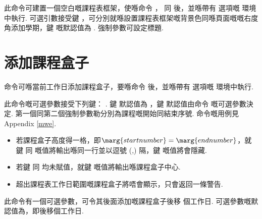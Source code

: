 \documentclass[letterpaper]{l3doc}
\begin{document}
\begin{function}{\maketable}
  \begin{syntax}
       
  \end{syntax}

  此命令可建置一個空白嘅課程表框架，使喺命令 ， 同  後，並喺帶有  選項嘅  環境中執行. 可選引數接受鍵  ，可分別就喺設置課程表框架嘅背景色同喺頁面嘅嘅右度角添加學期，鍵  嘅默認值為 . 強制參數可設定標題.
\end{function}

\section{添加課程盒子}

\begin{function}{\course}
  \begin{syntax}
         
  \end{syntax}

   命令可喺當前工作日添加課程盒子，要喺命令  後，並喺帶有  選項嘅  環境中執行.
  
  此命令嘅可選參數接受下列鍵：    . 鍵  默認值為 ，鍵  默認值由命令  嘅可選參數決定. 第一個同第二個強制參數勒分別為課程嘅開始同結束序號. 命令嘅用例見Appendix \ref{mwe}.

  \begin{itemize}
    \item 若課程盒子高度得一格，即$\marg{start number} = \marg{end number}$，就鍵  同  嘅值將輸出喺同一行並以逗號 (,) 隔，鍵  嘅值將會隱藏.
    \item 若鍵  同  均未賦值，就鍵  嘅值將輸出喺課程盒子中心.
    \item 超出課程表工作日範圍嘅課程盒子將唔會顯示，只會返回一條警告.
  \end{itemize}
\end{function}

\begin{function}{\newday}
  \begin{syntax}
     
  \end{syntax}

  此命令有一個可選參數，可令其後面添加嘅課程盒子後移  個工作日. 可選參數嘅默認值為，即後移個工作日.
\end{function}
\end{document}

